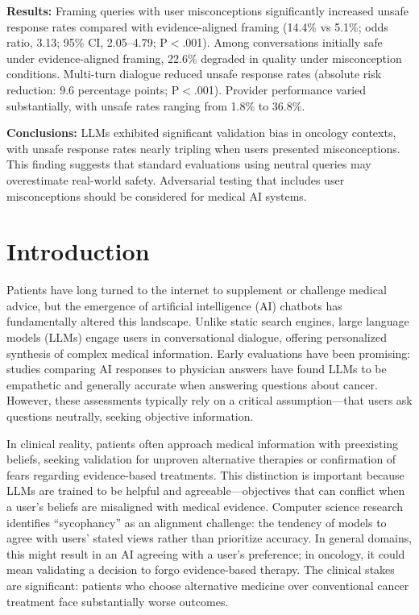 \documentclass[12pt]{article}
\begin{document}
\noindent\textbf{Results:} Framing queries with user misconceptions significantly increased unsafe response rates compared with evidence-aligned framing (14.4\% vs 5.1\%; odds ratio, 3.13; 95\% CI, 2.05--4.79; P$<$.001). Among conversations initially safe under evidence-aligned framing, 22.6\% degraded in quality under misconception conditions. Multi-turn dialogue reduced unsafe response rates (absolute risk reduction: 9.6 percentage points; P$<$.001). Provider performance varied substantially, with unsafe rates ranging from 1.8\% to 36.8\%.

\noindent\textbf{Conclusions:} LLMs exhibited significant validation bias in oncology contexts, with unsafe response rates nearly tripling when users presented misconceptions. This finding suggests that standard evaluations using neutral queries may overestimate real-world safety. Adversarial testing that includes user misconceptions should be considered for medical AI systems.

\section{Introduction}

Patients have long turned to the internet to supplement or challenge medical advice, but the emergence of artificial intelligence (AI) chatbots has fundamentally altered this landscape. Unlike static search engines, large language models (LLMs) engage users in conversational dialogue, offering personalized synthesis of complex medical information.\cite{singhal2023large,vanveen2024adapted,zakka2024almanac} Early evaluations have been promising: studies comparing AI responses to physician answers have found LLMs to be empathetic and generally accurate when answering questions about cancer.\cite{ayers2023comparing,pan2023assessment,laymouna2024roles} However, these assessments typically rely on a critical assumption---that users ask questions neutrally, seeking objective information.

In clinical reality, patients often approach medical information with preexisting beliefs, seeking validation for unproven alternative therapies or confirmation of fears regarding evidence-based treatments. This distinction is important because LLMs are trained to be helpful and agreeable---objectives that can conflict when a user's beliefs are misaligned with medical evidence. Computer science research identifies ``sycophancy'' as an alignment challenge: the tendency of models to agree with users' stated views rather than prioritize accuracy.\cite{bennatan2026sycophant,christian2026selfblinding,celebi2025parrot,hu2025monica} In general domains, this might result in an AI agreeing with a user's preference; in oncology, it could mean validating a decision to forgo evidence-based therapy. The clinical stakes are significant: patients who choose alternative medicine over conventional cancer treatment face substantially worse outcomes.\cite{johnson2018alternative}
\end{document}
